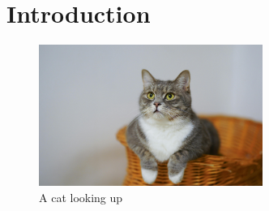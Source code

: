 \section{Introduction}

\lipsum[1]

\begin{figure}[H]
    \centering
    \includegraphics[width=0.65\textwidth]{Figures/figure1.jpg}
    \caption{A cat looking up}
    \label{fig:looking-up}
\end{figure}

\lipsum[2]
